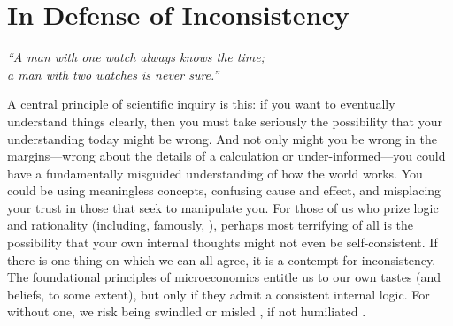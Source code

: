 

\section{In Defense of Inconsistency}
    \label{sec:defend-inconsist}

\begin{center}
    \noindent\singlespacingplus
    \it
    ``A man with one watch always knows the time;\\
    a man with two watches is never sure.'' \\
    \citep{segal-law}
\end{center}

%
A central principle of scientific inquiry is this:
    if you want to eventually understand things clearly, then you must take seriously the possibility that your understanding today might be wrong. 
And not only might you be wrong in the margins---wrong about the details of a calculation or under-informed---you could have a fundamentally misguided understanding of how the world works. You could be using meaningless concepts, confusing cause and effect, and misplacing your trust in those that seek to manipulate you. 
For those of us who prize logic and rationality (including, famously, 
\citet{descartes}),
perhaps most terrifying of all is the possibility that your own internal thoughts might not even be self-consistent.
If there is one thing on which we can all agree, it is a contempt for inconsistency.
The foundational principles of microeconomics entitle us to our own tastes (and beliefs, to some extent), but only if they admit a consistent internal logic.
For without one, we risk being swindled \citep{sep-dutch-book} or misled 
\citep{priest1996paraconsistent}, 
if not humiliated \citep{finocchiaro1981fallacies,russell1902letter}.


